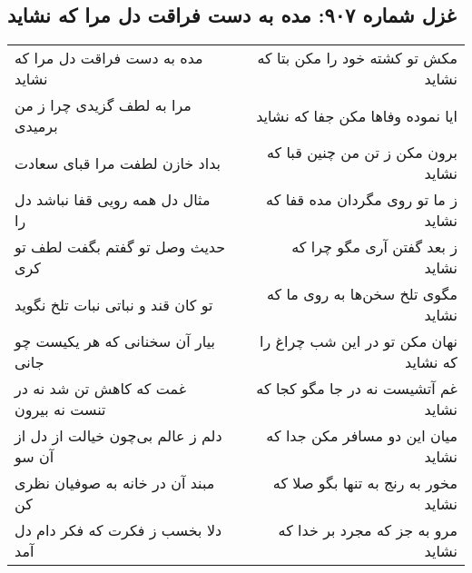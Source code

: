 \begin{center}
\section*{غزل شماره ۹۰۷: مده به دست فراقت دل مرا که نشاید}
\label{sec:0907}
\begin{longtable}{l p{0.5cm} r}
مده به دست فراقت دل مرا که نشاید
&&
مکش تو کشته خود را مکن بتا که نشاید
\\
مرا به لطف گزیدی چرا ز من برمیدی
&&
ایا نموده وفاها مکن جفا که نشاید
\\
بداد خازن لطفت مرا قبای سعادت
&&
برون مکن ز تن من چنین قبا که نشاید
\\
مثال دل همه رویی قفا نباشد دل را
&&
ز ما تو روی مگردان مده قفا که نشاید
\\
حدیث وصل تو گفتم بگفت لطف تو کری
&&
ز بعد گفتن آری مگو چرا که نشاید
\\
تو کان قند و نباتی نبات تلخ نگوید
&&
مگوی تلخ سخن‌ها به روی ما که نشاید
\\
بیار آن سخنانی که هر یکیست چو جانی
&&
نهان مکن تو در این شب چراغ را که نشاید
\\
غمت که کاهش تن شد نه در تنست نه بیرون
&&
غم آتشیست نه در جا مگو کجا که نشاید
\\
دلم ز عالم بی‌چون خیالت از دل از آن سو
&&
میان این دو مسافر مکن جدا که نشاید
\\
مبند آن در خانه به صوفیان نظری کن
&&
مخور به رنج به تنها بگو صلا که نشاید
\\
دلا بخسب ز فکرت که فکر دام دل آمد
&&
مرو به جز که مجرد بر خدا که نشاید
\\
\end{longtable}
\end{center}
